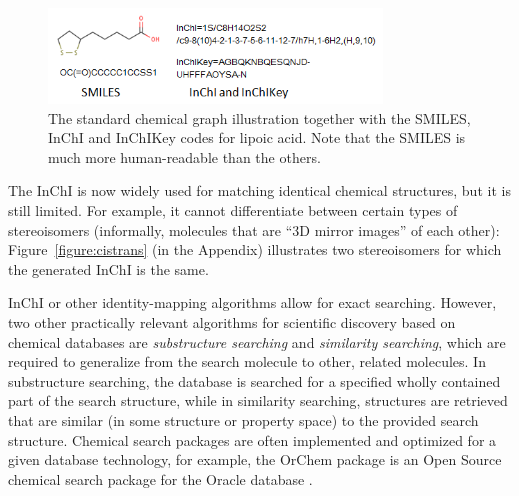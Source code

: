 \documentclass{../sig-alternate}
\begin{document}
\begin{figure}
\centering
\includegraphics[height=1in]{lipoicacid.png}
\caption{The standard chemical graph illustration together with the
  SMILES, InChI and InChIKey codes for lipoic acid. Note that the
  SMILES is much more human-readable than the others.}
\label{figure:smiles}
\end{figure}

The InChI is now widely used for matching identical chemical
structures, but it is still limited. For example, it cannot
differentiate between certain types of stereoisomers (informally,
molecules that are ``3D mirror images'' of each other):
Figure~\ref{figure:cistrans} (in the Appendix) illustrates two
stereoisomers for which the generated InChI is the same.

InChI or other identity-mapping algorithms allow for exact
searching. However, two other practically relevant algorithms for
scientific discovery based on chemical databases are
\emph{substructure searching} and \emph{similarity searching}, which
are required to generalize from the search molecule 
to other, related molecules. In substructure
searching, the database is searched for a specified wholly contained
part of the search structure, while in similarity searching,
structures are retrieved that are similar (in some structure or
property space) to the provided search structure. Chemical
search packages are often implemented and optimized for a given
database technology, for example, the OrChem package is an Open Source
chemical search package for the Oracle database \cite{rijnbeek2009}.
\end{document}
